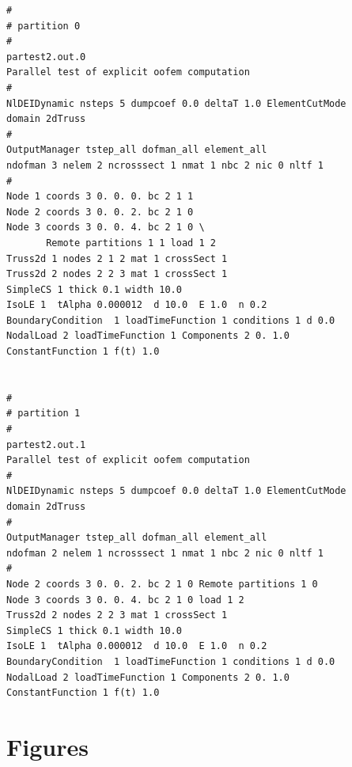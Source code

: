 \documentclass[a4paper]{article}
\begin{document}
\begin{verbatim}
#
# partition 0
#
partest2.out.0
Parallel test of explicit oofem computation
#
NlDEIDynamic nsteps 5 dumpcoef 0.0 deltaT 1.0 ElementCutMode
domain 2dTruss
#
OutputManager tstep_all dofman_all element_all
ndofman 3 nelem 2 ncrosssect 1 nmat 1 nbc 2 nic 0 nltf 1
#
Node 1 coords 3 0. 0. 0. bc 2 1 1
Node 2 coords 3 0. 0. 2. bc 2 1 0
Node 3 coords 3 0. 0. 4. bc 2 1 0 \
       Remote partitions 1 1 load 1 2
Truss2d 1 nodes 2 1 2 mat 1 crossSect 1
Truss2d 2 nodes 2 2 3 mat 1 crossSect 1
SimpleCS 1 thick 0.1 width 10.0
IsoLE 1  tAlpha 0.000012  d 10.0  E 1.0  n 0.2
BoundaryCondition  1 loadTimeFunction 1 conditions 1 d 0.0
NodalLoad 2 loadTimeFunction 1 Components 2 0. 1.0
ConstantFunction 1 f(t) 1.0


#
# partition 1
#
partest2.out.1
Parallel test of explicit oofem computation
#
NlDEIDynamic nsteps 5 dumpcoef 0.0 deltaT 1.0 ElementCutMode
domain 2dTruss
#
OutputManager tstep_all dofman_all element_all
ndofman 2 nelem 1 ncrosssect 1 nmat 1 nbc 2 nic 0 nltf 1
#
Node 2 coords 3 0. 0. 2. bc 2 1 0 Remote partitions 1 0
Node 3 coords 3 0. 0. 4. bc 2 1 0 load 1 2
Truss2d 2 nodes 2 2 3 mat 1 crossSect 1
SimpleCS 1 thick 0.1 width 10.0
IsoLE 1  tAlpha 0.000012  d 10.0  E 1.0  n 0.2
BoundaryCondition  1 loadTimeFunction 1 conditions 1 d 0.0
NodalLoad 2 loadTimeFunction 1 Components 2 0. 1.0
ConstantFunction 1 f(t) 1.0
\end{verbatim}

\section{Figures}
\end{document}
